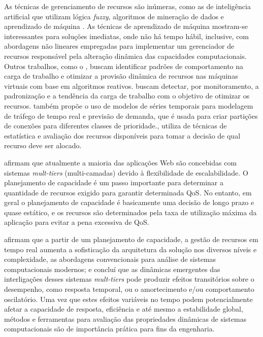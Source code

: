 As técnicas de gerenciamento de recursos são inúmeras, como as de inteligência artificial que utilizam lógica \textit{fuzzy}, algoritmos de mineração de dados e aprendizado de máquina \cite{Nobile2013}. As técnicas de aprendizado de máquina mostram-se interessantes para soluções imediatas, onde não há tempo hábil, inclusive, com abordagens não lineares empregadas para implementar um gerenciador de recursos responsável pela alteração dinâmica das capacidades computacionais. Outros trabalhos, como o , buscam identificar padrões de comportamento na carga de trabalho e otimizar a provisão dinâmica de recursos nas máquinas virtuais com base em algoritmos reativos.  buscam detectar, por monitoramento, a padronização e a tendência da carga de trabalho com o objetivo de otimizar os recursos.  também propõe o uso de modelos de séries temporais para modelagem de tráfego de tempo real e previsão de demanda, que é usada para criar partições de conexões para diferentes classes de prioridade., utiliza de técnicas de estatística e avaliação dos recursos disponíveis para tomar a decisão de qual recurso deve ser alocado.


 afirmam que atualmente a maioria das aplicações Web são concebidas com sistemas \textit{mult-tiers} (multi-camadas) devido à flexibilidade de escalabilidade. O planejamento de capacidade é um passo importante para determinar a quantidade de recursos exigido para garantir determinada QoS. No entanto, em geral o planejamento de capacidade é basicamente uma decisão de longo prazo e quase estático, e os recursos são determinados pela taxa de utilização máxima da aplicação para evitar a pena excessiva de QoS.

 afirmam que a partir de um planejamento de capacidade, a gestão de recursos em tempo real aumenta a sofisticação da arquitetura da solução nos diversos níveis e complexidade, as abordagens convencionais para análise de sistemas computacionais modernos; e concluí que as dinâmicas emergentes das interligações desses sistemas \textit{mult-tiers} pode produzir efeitos transitórios sobre o desempenho, como resposta temporal, ou o amortecimento e/ou comportamento oscilatório. Uma vez que estes efeitos variáveis no tempo podem potencialmente afetar a capacidade de resposta, eficiência e até mesmo a estabilidade global, métodos e ferramentas para avaliação das propriedades dinâmicas de sistemas computacionais são de importância prática para fins da engenharia.

